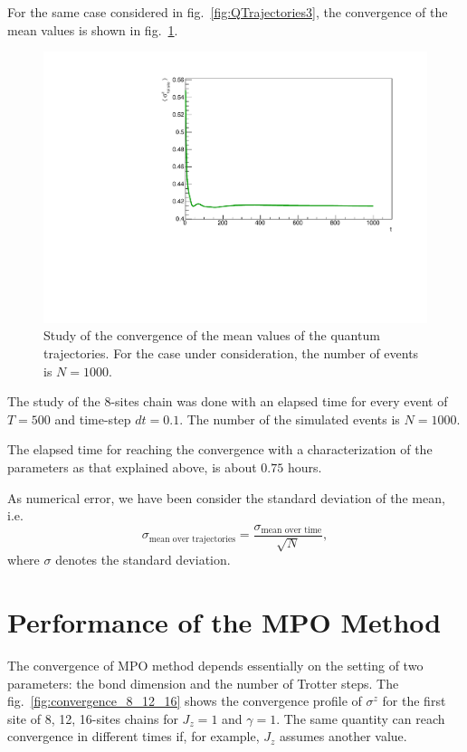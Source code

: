 For the same case considered in fig.~\ref{fig:QTrajectories3}, the convergence of the mean values is shown in fig.~\ref{fig:Convergence_s8J1051}. 

\begin{figure}[H]
    \centering
    \includegraphics[scale=0.6]{Figures/Convergence_s8J1051.pdf}
    \captionsetup{width=1.\linewidth}
    \caption{Study of the convergence of the mean values of the quantum trajectories. For the case under consideration, the number of events is $N = 1000$.}
    \label{fig:Convergence_s8J1051}
\end{figure}

The study of the 8-sites chain was done with an elapsed time for every event of $T = 500$ and time-step $dt = 0.1$. The number of the simulated events is $N = 1000$.

The elapsed time for reaching the convergence with a characterization of the parameters as that explained above, is about $0.75$ hours. 

As numerical error, we have been consider the standard deviation of the mean, i.e.
\begin{equation*}
    \sigma_{\text{mean over trajectories}} = \frac{\sigma_\text{mean over time}}{\sqrt{N}},
\end{equation*}
where $\sigma$ denotes the standard deviation.


\section{Performance of the MPO Method}
The convergence of MPO method depends essentially on the setting of two parameters: the bond dimension and the number of Trotter steps. The fig.~\ref{fig:convergence_8_12_16} shows the convergence profile of $\sigma^z$ for the first site of 8, 12, 16-sites chains for $J_z = 1$ and $\gamma = 1$. The same quantity can reach convergence in different times if, for example, $J_z$ assumes another value. 

